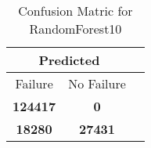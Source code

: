\begin{table}[] 
\caption{Confusion Matric for RandomForest10} 
\label{Table: Prediction Accuracy-DMDRandomForest10OnlySunEKF-resetReflectionperfectNoFailurePrediction-Reflection} 
\centering 
\begin{tabular} 
 {@{}ccc@{}} 
\toprule 
\multicolumn{2}{c}{\textbf{Predicted}}
 \\ \midrule 
\multicolumn{1}{|c|}{Failure} & 
\multicolumn{1}{c|}{No Failure}
 \\ \midrule 
\multicolumn{1}{|c|}{\color{green}\textbf{124417}} & 
\multicolumn{1}{c|}{\color{red}\textbf{0}}
 \\ \midrule 
\multicolumn{1}{|c|}{\color{red}\textbf{18280}} & 
\multicolumn{1}{c|}{\color{green}\textbf{27431}}
 \\ \bottomrule 
\end{tabular} 
\end{table} 
